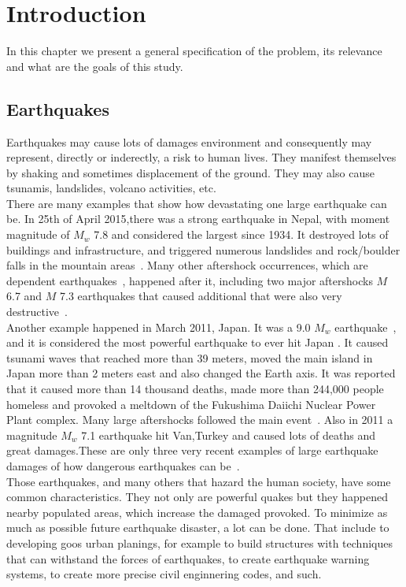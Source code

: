 \chapter{Introduction}\label{chapter1}
In this chapter we present a general specification of the problem, its relevance and what are the goals of this study.

\section{Earthquakes}
Earthquakes may cause lots of damages environment and consequently may represent, directly or inderectly, a risk to human lives. They manifest themselves by shaking and sometimes displacement of the ground. They may also cause tsunamis, landslides, volcano activities, etc.\\


There are many examples that show how devastating one large earthquake can be. In 25th of April 2015,there was a strong earthquake in Nepal, with moment magnitude of $M_w$ 7.8 and considered the largest since 1934. It destroyed lots of buildings and
infrastructure, and triggered numerous landslides and rock/boulder falls in the mountain areas~\cite{wilkinson20152015}. Many other aftershock occurrences, which are dependent earthquakes~\cite{van2012seismicity}, happened after it, including two major aftershocks $M$ 6.7 and $M$ 7.3 earthquakes that caused additional that were also very destructive~\cite{wilkinson20152015}.\\

Another example happened in March 2011, Japan. It was a 9.0 $M_w$ earthquake~\cite{simons20112011}, and it is considered the most powerful earthquake to ever hit Japan . It caused tsunami waves that reached more than 39 meters, moved the main island in Japan more than 2 meters east and also changed the Earth axis. It was reported that it caused more than 14 thousand deaths, made more than 244,000 people homeless and provoked a meltdown of the Fukushima Daiichi Nuclear Power Plant complex. Many large aftershocks followed the main event~\cite{mimura2011damage}. Also in 2011 a magnitude $M_w$ 7.1 earthquake hit Van,Turkey and caused lots of deaths and great damages.These are only three very recent examples of large earthquake damages of how dangerous earthquakes can be~\cite{irmak2012source}.\\

Those earthquakes, and many others that hazard the human society, have some common characteristics. They not only are powerful quakes but they happened nearby populated areas, which increase the damaged provoked. To minimize as much as possible future earthquake disaster, a lot can be done. That include to developing goos urban planings, for example to build structures with techniques that can withstand the forces of earthquakes, to create earthquake warning systems, to create more precise civil enginnering codes, and such.\\

